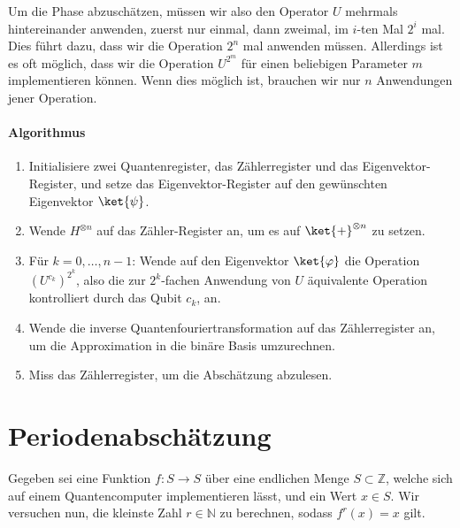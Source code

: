 Um die Phase abzuschätzen, müssen wir also den Operator $U$ mehrmals hintereinander anwenden, zuerst nur einmal, dann zweimal, im $i$-ten Mal $2^i$ mal. Dies führt dazu, dass wir die Operation $2^n$ mal anwenden müssen. Allerdings ist es oft möglich, dass wir die Operation $U^{2^m}$ für einen beliebigen Parameter $m$ implementieren können. Wenn dies möglich ist, brauchen wir nur $n$ Anwendungen jener Operation.

\paragraph{Algorithmus}
\begin{enumerate}
    \item Initialisiere zwei Quantenregister, das Zählerregister und das Eigenvektor-Register, und setze das Eigenvektor-Register auf den gewünschten Eigenvektor $\ket{\psi}$.
    \item Wende $H^{\otimes n}$ auf das Zähler-Register an, um es auf $\ket{+}^{\otimes n}$ zu setzen.
    \item Für $k = 0, \dots, n - 1$: Wende auf den Eigenvektor $\ket{\varphi}$ die Operation $(U^{c_k})^{2^k}$, also die zur $2^k$-fachen Anwendung von $U$ äquivalente Operation kontrolliert durch das Qubit $c_k$, an.
    \item Wende die inverse Quantenfouriertransformation auf das Zählerregister an, um die Approximation in die binäre Basis umzurechnen.
    \item Miss das Zählerregister, um die Abschätzung abzulesen.
\end{enumerate}
\paragraph{}

\paragraph{}

\section{Periodenabschätzung}
Gegeben sei eine Funktion $f : S \rightarrow S$ über eine endlichen Menge $S \subset \mathbb{Z}$, welche sich auf einem Quantencomputer implementieren lässt, und ein Wert $x \in S$. Wir versuchen nun, die kleinste Zahl $r \in \mathbb{N}$ zu berechnen, sodass $f^r(x) = x$ gilt.
